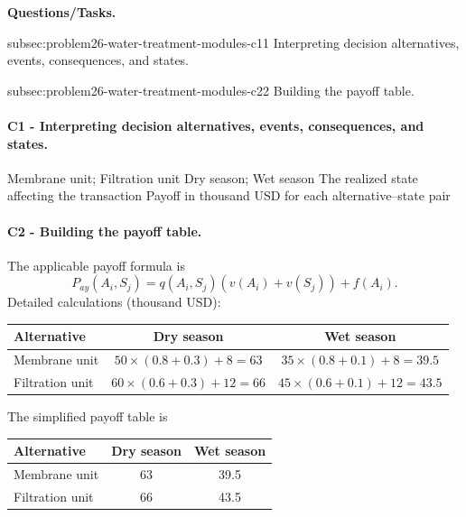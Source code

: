 	\textbf{Questions/Tasks.}
	\begin{enumerate}
	\CriterionTask
	{subsec:problem26-water-treatment-modules-c1}{1}
	{Interpreting decision alternatives, events, consequences, and states.}

	\CriterionTask
	{subsec:problem26-water-treatment-modules-c2}{2}
	{Building the payoff table.}
	\end{enumerate}

	\paragraph*{C1 - Interpreting decision alternatives, events, consequences, and states.}
	\label{subsec:problem26-water-treatment-modules-c1}
	\DecisionElementsTable
	{Membrane unit; Filtration unit}
	{Dry season; Wet season}
	{The realized state affecting the transaction}
	{Payoff in thousand USD for each alternative--state pair}

	\paragraph*{C2 - Building the payoff table.}
	\label{subsec:problem26-water-treatment-modules-c2}
	The applicable payoff formula is
	\[ P_{ay}(A_i,S_j)=q(A_i,S_j)\left(v(A_i)+v(S_j)\right)+f(A_i). \]
	Detailed calculations (thousand USD):
	\begin{center}\small
	\begin{tabular}{lcc}
	\toprule
	Alternative & Dry season & Wet season \\
	\midrule
	Membrane unit & $50\times(0.8+0.3)+8=63$ & $35\times(0.8+0.1)+8=39.5$ \\
Filtration unit & $60\times(0.6+0.3)+12=66$ & $45\times(0.6+0.1)+12=43.5$ \\
	\bottomrule
	\end{tabular}
	\end{center}
	The simplified payoff table is
	\begin{center}
	\begin{tabular}{lcc}
	\toprule
	Alternative & Dry season & Wet season \\
	\midrule
	Membrane unit & 63 & 39.5 \\
Filtration unit & 66 & 43.5 \\
	\bottomrule
	\end{tabular}
	\end{center}


